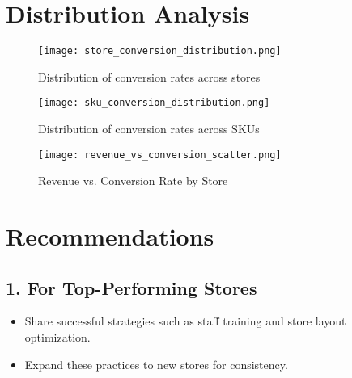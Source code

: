 \documentclass[11pt,a4paper]{article}
\begin{document}
\section*{Distribution Analysis}

\begin{figure}[H]
    \colorbox{figurebg}{
    \begin{minipage}{\dimexpr\linewidth-2\fboxsep}
        \centering
        \texttt{[image: store\_conversion\_distribution.png]}
        \caption{Distribution of conversion rates across stores}
    \end{minipage}}
\end{figure}

\vspace{1em}

\begin{figure}[H]
    \colorbox{figurebg}{
    \begin{minipage}{\dimexpr\linewidth-2\fboxsep}
        \centering
        \texttt{[image: sku\_conversion\_distribution.png]}
        \caption{Distribution of conversion rates across SKUs}
    \end{minipage}}
\end{figure}

\vspace{1em}

\begin{figure}[H]
    \colorbox{figurebg}{
    \begin{minipage}{\dimexpr\linewidth-2\fboxsep}
        \centering
        \texttt{[image: revenue\_vs\_conversion\_scatter.png]}
        \caption{Revenue vs. Conversion Rate by Store}
    \end{minipage}}
\end{figure}

\section*{Recommendations}

\subsection*{1. For Top-Performing Stores}
\begin{itemize}
    \item Share successful strategies such as staff training and store layout optimization.
    \item Expand these practices to new stores for consistency.
\end{itemize}
\end{document}
